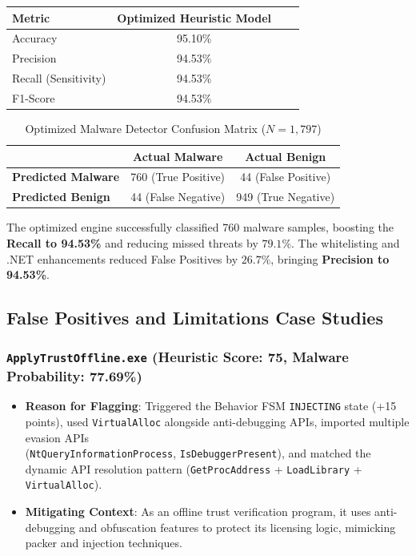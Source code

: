 \documentclass[11pt,a4paper]{article}
\begin{document}
\begin{table}[h]
\centering

\label{tab:metrics_comparison}
\begin{tabular}{lccc}
\toprule
\textbf{Metric} & \textbf{Optimized Heuristic Model} \\
\midrule
Accuracy  & 95.10\%\\
Precision & 94.53\% & \\
Recall (Sensitivity)  & 94.53\%\\
F1-Score & 94.53\%  \\
\bottomrule
\end{tabular}
\end{table}

\begin{table}[h]
\centering
\caption{Optimized Malware Detector Confusion Matrix ($N = 1,797$)}
\label{tab:confusion}
\begin{tabular}{lcc}
\toprule
& \textbf{Actual Malware} & \textbf{Actual Benign} \\
\midrule
\textbf{Predicted Malware} & 760 (True Positive) & 44 (False Positive) \\
\textbf{Predicted Benign} & 44 (False Negative) & 949 (True Negative) \\
\bottomrule
\end{tabular}
\end{table}

The optimized engine successfully classified 760 malware samples, boosting the \textbf{Recall to 94.53\%} and reducing missed threats by $79.1\%$. The whitelisting and .NET enhancements reduced False Positives by $26.7\%$, bringing \textbf{Precision to 94.53\%}.

\subsection{False Positives and Limitations Case Studies}
\subsubsection{\texttt{ApplyTrustOffline.exe} (Heuristic Score: 75, Malware Probability: 77.69\%)}
\begin{itemize}
    \item \textbf{Reason for Flagging}: Triggered the Behavior FSM \texttt{INJECTING} state (+15 points), used \texttt{VirtualAlloc} alongside anti-debugging APIs, imported multiple evasion APIs \\(\texttt{NtQueryInformationProcess}, \texttt{IsDebuggerPresent}), and matched the dynamic API resolution pattern (\texttt{GetProcAddress} + \texttt{LoadLibrary} + \texttt{VirtualAlloc}).
    \item \textbf{Mitigating Context}: As an offline trust verification program, it uses anti-debugging and obfuscation features to protect its licensing logic, mimicking packer and injection techniques.
\end{itemize}
\end{document}
